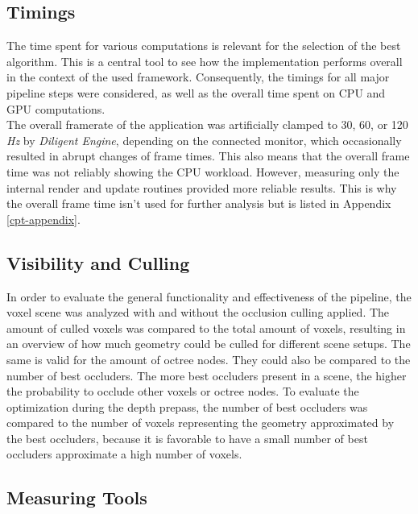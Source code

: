\subsection*{Timings} \label{subsec-timings}

The time spent for various computations is relevant for the selection of the best algorithm. This is a central 
tool to see how the implementation performs overall in the context of the used framework. Consequently, the 
timings for all major pipeline steps were considered, as well as the overall time spent on \ac{CPU} and \ac{GPU} 
computations. \\

\noindent 
The overall framerate of the application was artificially clamped to 30, 60, or 120 \emph{Hz} by \emph{Diligent Engine}, 
depending on the connected monitor, which occasionally resulted in abrupt changes of frame times. This also means 
that the overall frame time was not reliably showing the \ac{CPU} workload. However, measuring only the internal render 
and update routines provided more reliable results. This is why the overall frame time isn't used for further analysis 
but is listed in Appendix \ref{cpt-appendix}.


\subsection*{Visibility and Culling} \label{subsec-visibility-and-culling}

In order to evaluate the general functionality and effectiveness of the pipeline, the voxel scene was analyzed 
with and without the occlusion culling applied. The amount of culled voxels was compared to the total amount of 
voxels, resulting in an overview of how much geometry could be culled for different scene setups. The same is 
valid for the amount of octree nodes. They could also be compared to the number of best occluders. The more best 
occluders present in a scene, the higher the probability to occlude other voxels or octree nodes. To evaluate 
the optimization during the depth prepass, the number of best occluders was compared to the number of voxels 
representing the geometry approximated by the best occluders, because it is favorable to have a small number of 
best occluders approximate a high number of voxels.\\


\subsection*{Measuring Tools} \label{subsec-measuring-tools}

